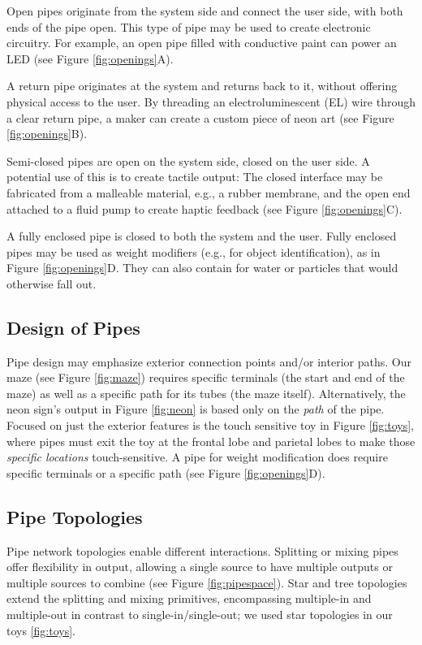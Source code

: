 Open pipes originate from the system side and connect the user side, with both ends of the pipe open. This type of pipe may be used to create electronic circuitry.  For example, an open pipe filled with conductive paint can power an LED (see Figure \ref{fig:openings}A).

A return pipe originates at the system and returns back to it, without offering physical access to the user.  By threading an electroluminescent (EL) wire through a clear return pipe, a maker can create a custom piece of neon art (see Figure \ref{fig:openings}B).

Semi-closed pipes are open on the system side, closed on the user side. A potential use of this is to create tactile output: The closed interface may be fabricated from a malleable material, e.g., a rubber membrane, and the open end attached to a fluid pump to create haptic feedback (see Figure \ref{fig:openings}C).

A fully enclosed pipe is closed to both the system and the user.  Fully enclosed pipes may be used as weight modifiers (e.g., for object identification), as in Figure \ref{fig:openings}D.  They can also contain for water or particles that would otherwise fall out.

\subsection{Design of Pipes}
Pipe design may emphasize exterior connection points and/or interior paths.  Our maze (see Figure \ref{fig:maze}) requires specific terminals (the start and end of the maze) as well as a specific path for its tubes (the maze itself).  Alternatively, the neon sign's output in Figure \ref{fig:neon} is based only on the \emph{path} of the pipe.  Focused on just the exterior features is the touch sensitive toy in Figure \ref{fig:toys}, where pipes must exit the toy at the frontal lobe and parietal lobes to make those \emph{specific locations} touch-sensitive.  A pipe for weight modification does require specific terminals or a specific path (see Figure \ref{fig:openings}D).

\subsection{Pipe Topologies}

Pipe network topologies enable different interactions.  Splitting or mixing pipes offer flexibility in output, allowing a single source to have multiple outputs or multiple sources to combine (see Figure \ref{fig:pipespace}).  Star and tree topologies extend the splitting and mixing primitives, encompassing multiple-in and multiple-out in contrast to single-in/single-out; we used star topologies in our toys \ref{fig:toys}.

